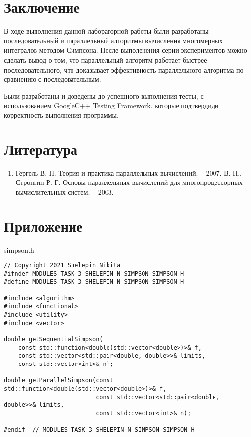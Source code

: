 \documentclass{report}
\begin{document}
\section*{Заключение}
В ходе выполнения данной лабораторной работы были разработаны последовательный и параллельный алгоритмы вычисления многомерных интегралов методом Симпсона. После выполенения серии экспериментов можно сделать вывод о том, что параллельный алгоритм работает быстрее последовательного, что доказывает эффективность параллельного алгоритма по сравнению с последовательным.
\par Были разработаны и доведены до успешного выполнения тесты,  с использованием GoogleC++ Testing Framework, которые  подтвердиди корректность выполнения  программы.
\newpage

\section*{Литература}
\begin{enumerate}
\item Гергель В. П. Теория и практика параллельных вычислений. – 2007.
 В. П., Стронгин Р. Г. Основы параллельных вычислений для многопроцессорных вычислительных систем. – 2003.

\end{enumerate} 
\newpage

\section*{Приложение}

simpson.h
\begin{lstlisting}
// Copyright 2021 Shelepin Nikita
#ifndef MODULES_TASK_3_SHELEPIN_N_SIMPSON_SIMPSON_H_
#define MODULES_TASK_3_SHELEPIN_N_SIMPSON_SIMPSON_H_

#include <algorithm>
#include <functional>
#include <utility>
#include <vector>

double getSequentialSimpson(
    const std::function<double(std::vector<double>)>& f,
    const std::vector<std::pair<double, double>>& limits,
    const std::vector<int>& n);

double getParallelSimpson(const std::function<double(std::vector<double>)>& f,
                          const std::vector<std::pair<double, double>>& limits,
                          const std::vector<int>& n);

#endif  // MODULES_TASK_3_SHELEPIN_N_SIMPSON_SIMPSON_H_
\end{lstlisting}
\end{document}
